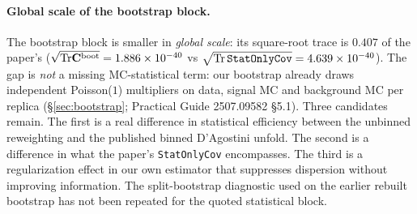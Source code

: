\paragraph{Global scale of the bootstrap block.} The bootstrap block is smaller in \emph{global scale}: its square-root trace is $0.407$ of the paper's ($\sqrt{\mathrm{Tr}\mathbf{C}^{\text{boot}}}=1.886\times10^{-40}$ vs $\sqrt{\mathrm{Tr}\,\texttt{StatOnlyCov}}=4.639\times10^{-40}$). The gap is \emph{not} a missing MC-statistical term: our bootstrap already draws independent Poisson($1$) multipliers on data, signal MC and background MC per replica (\S\ref{sec:bootstrap}; Practical Guide 2507.09582 \S5.1). Three candidates remain. The first is a real difference in statistical efficiency between the unbinned reweighting and the published binned D'Agostini unfold. The second is a difference in what the paper's \texttt{StatOnlyCov} encompasses. The third is a regularization effect in our own estimator that suppresses dispersion without improving information. The split-bootstrap diagnostic used on the earlier rebuilt bootstrap has not been repeated for the quoted statistical block.

